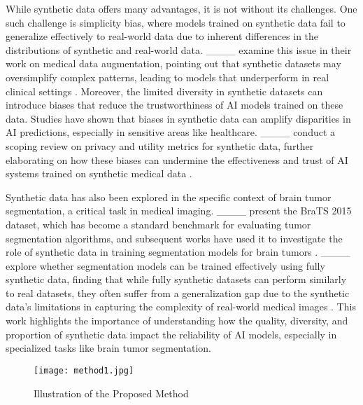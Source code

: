 While synthetic data offers many advantages, it is not without its challenges. One such challenge is simplicity bias, where models trained on synthetic data fail to generalize effectively to real-world data due to inherent differences in the distributions of synthetic and real-world data. ____ examine this issue in their work on medical data augmentation, pointing out that synthetic datasets may oversimplify complex patterns, leading to models that underperform in real clinical settings . Moreover, the limited diversity in synthetic datasets can introduce biases that reduce the trustworthiness of AI models trained on these data. Studies have shown that biases in synthetic data can amplify disparities in AI predictions, especially in sensitive areas like healthcare. ____ conduct a scoping review on privacy and utility metrics for synthetic data, further elaborating on how these biases can undermine the effectiveness and trust of AI systems trained on synthetic medical data .

Synthetic data has also been explored in the specific context of brain tumor segmentation, a critical task in medical imaging. ____ present the BraTS 2015 dataset, which has become a standard benchmark for evaluating tumor segmentation algorithms, and subsequent works have used it to investigate the role of synthetic data in training segmentation models for brain tumors . ____ explore whether segmentation models can be trained effectively using fully synthetic data, finding that while fully synthetic datasets can perform similarly to real datasets, they often suffer from a generalization gap due to the synthetic data's limitations in capturing the complexity of real-world medical images . This work highlights the importance of understanding how the quality, diversity, and proportion of synthetic data impact the reliability of AI models, especially in specialized tasks like brain tumor segmentation.

\begin{figure*}[!ht]
    \centering
    \texttt{[image: method1.jpg]} 
    \caption{Illustration of the Proposed Method}
    \label{fig:method_illustration}
\end{figure*}


